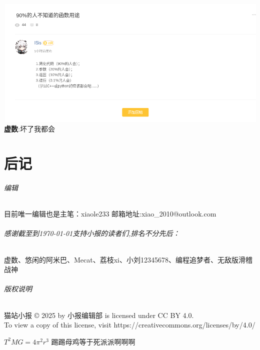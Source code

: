 \documentclass[UTF8]{ctexart}
\begin{document}
\includegraphics[width=0.8\textwidth\\]{assets/02/toliet-4.png} \\
\textbf{虚数}:坏了我都会
\pagebreak
\part{后记}
\paragraph{编辑} 目前唯一编辑也是主笔：xiaole233 邮箱地址:xiao\_2010@outlook.com
\paragraph{感谢截至到\today 支持小报的读者们,排名不分先后：}
\begin{center}虚数、悠​闲​的​阿​米​巴​、Mecat、荔枝xi、小刘12345678、编程追梦者、无敌版滑稽战神
\end{center}
\paragraph{版权说明} 
猫站小报 © 2025 by 小报编辑部 is licensed under CC BY 4.0.\\ To view a copy of this license, visit https://creativecommons.org/licenses/by/4.0/ \\
\begin{center}
$T^2MG=4\pi^2r^3$ 踢踢母鸡等于死派派啊啊啊
\end{center}
\end{document}
